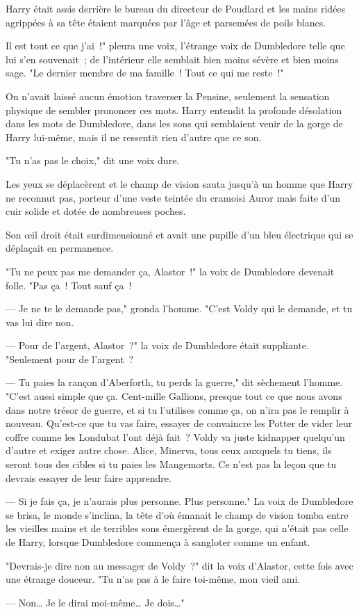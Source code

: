 \begin{em}
Harry était assis derrière le bureau du directeur de Poudlard et les mains ridées agrippées à sa tête étaient marquées par l'âge et parsemées de poils blancs.

Il est tout ce que j'ai~!" pleura une voix, l'étrange voix de Dumbledore telle que lui s'en souvenait~; de l'intérieur elle semblait bien moins sévère et bien moins sage. "Le dernier membre de ma famille~! Tout ce qui me reste~!"

On n'avait laissé aucun émotion traverser la Pensine, seulement la sensation physique de sembler prononcer ces mots. Harry entendit la profonde désolation dans les mots de Dumbledore, dans les sons qui semblaient venir de la gorge de Harry lui-même, mais il ne ressentit rien d'autre que ce son.

"Tu n'as pas le choix," dit une voix dure.

Les yeux se déplacèrent et le champ de vision sauta jusqu'à un homme que Harry ne reconnut pas, porteur d'une veste teintée du cramoisi Auror mais faite d'un cuir solide et dotée de nombreuses poches.

Son œil droit était surdimensionné et avait une pupille d'un bleu électrique qui se déplaçait en permanence.

"Tu ne peux pas me demander ça, Alastor~!" la voix de Dumbledore devenait folle. "Pas ça~! Tout sauf ça~!

--- Je ne te le demande pas," gronda l'homme. "C'est Voldy qui le demande, et tu vas lui dire non.

--- Pour de l'argent, Alastor~?" la voix de Dumbledore était suppliante. "Seulement pour de l'argent~?

--- Tu paies la rançon d'Aberforth, tu perds la guerre," dit sèchement l'homme. "C'est aussi simple que ça. Cent-mille Gallions, presque tout ce que nous avons dans notre trésor de guerre, et si tu l'utilises comme ça, on n'ira pas le remplir à nouveau. Qu'est-ce que tu vas faire, essayer de convaincre les Potter de vider leur coffre comme les Londubat l'ont déjà fait~? Voldy va juste kidnapper quelqu'un d'autre et exiger autre chose. Alice, Minerva, tous ceux auxquels tu tiens, ils seront tous des cibles si tu paies les Mangemorts. Ce n'est pas la leçon que tu devrais essayer de leur faire apprendre.

--- Si je fais ça, je n'aurais plus personne. Plus personne." La voix de Dumbledore se brisa, le monde s'inclina, la tête d'où émanait le champ de vision tomba entre les vieilles mains et de terribles sons émergèrent de la gorge, qui n'était pas celle de Harry, lorsque Dumbledore commença à sangloter comme un enfant.

"Devrais-je dire non au messager de Voldy~?" dit la voix d'Alastor, cette fois avec une étrange douceur. "Tu n'as pas à le faire toi-même, mon vieil ami.

--- Non… Je le dirai moi-même… Je dois…"
\end{em}

